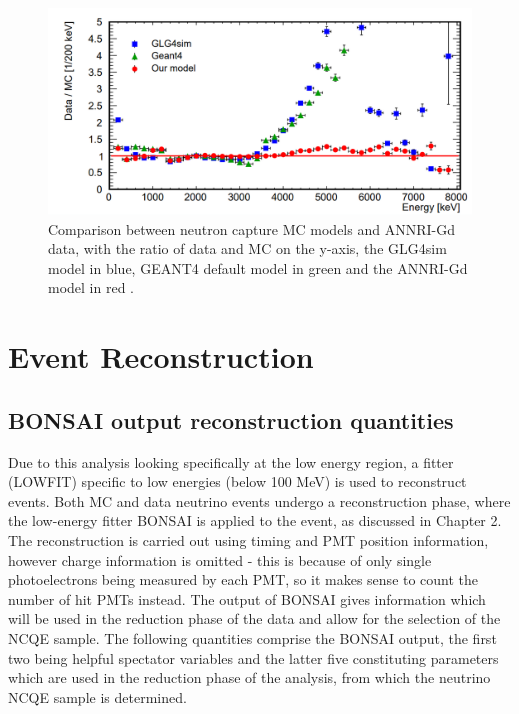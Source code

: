 \begin{figure}[htp]
    \centering
\includegraphics[width=\textwidth]{Figures/annrigdmodelcompare.png}
\caption[Comparison between neutron capture MC models and ANNRI-Gd data, with the ratio of data and MC on the y-axis, the GLG4sim model in blue, GEANT4 default model in green and the ANNRI-Gd model in red.]{Comparison between neutron capture MC models and ANNRI-Gd data, with the ratio of data and MC on the y-axis, the GLG4sim model in blue, GEANT4 default model in green and the ANNRI-Gd model in red \cite{annri_gd_energy}.}
\label{fig:annrigdmodelcompare}
\end{figure}


\section{Event Reconstruction}
\subsection{BONSAI output reconstruction quantities}

Due to this analysis looking specifically at the low energy region, a fitter (LOWFIT) specific to low energies (below 100 MeV) is used to reconstruct events. Both MC and data neutrino events undergo a reconstruction phase, where the low-energy fitter BONSAI is applied to the event, as discussed in Chapter 2. The reconstruction is carried out using timing and PMT position information, however charge information is omitted - this is because of only single photoelectrons being measured by each PMT, so it makes sense to count the number of hit PMTs instead. The output of BONSAI gives information which will be used in the reduction phase of the data and allow for the selection of the NCQE sample. The following quantities comprise the BONSAI output, the first two being helpful spectator variables and the latter five constituting parameters which are used in the reduction phase of the analysis, from which the neutrino NCQE sample is determined.\\



